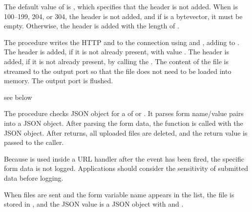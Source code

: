 The default value of  is , which specifies that
the  header is not added. When  is
100--199, 204, or 304, the  header is not added,
and if  is a bytevector, it must be empty. Otherwise, the
 header is added with the length of
.

\begin{procedure}
\end{procedure}
\returns{} 

The  procedure writes the HTTP 
and  to the connection  using
 and , adding
 to .  The 
header is added, if it is not already present, with value
.  The  header is added, if it
is not already present, by calling the .  The
content of the file is streamed to the output port so that the file
does not need to be loaded into memory. The output port is flushed.

\begin{procedure}
\end{procedure}
\returns{} see below

The  procedure checks JSON object
 for a  of 
or . It parses form name/value
pairs into a JSON object.  After parsing the form data, the function
 is called with the JSON object. After  returns, all
uploaded files are deleted, and the return value is passed to the
caller.

Because  is used inside a URL handler after
the  event has been fired, the specific form data
is not logged. Applications should consider the sensitivity of
submitted data before logging.

When files are sent and the form variable name appears in the
 list, the file is stored in , and the JSON
value is a JSON object with  and
.

